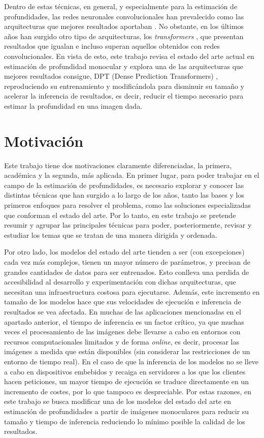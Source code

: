 Dentro de estas técnicas, en general, y especialmente para la estimación de profundidades, las redes neuronales convolucionales han prevalecido como las arquitecturas que mejores resultados aportaban \cite{resnet, efficientnet, gan-depth, Xian_2020_CVPR}. No obstante, en los últimos años han surgido otro tipo de arquitecturas, los \textit{transformers} \cite{NIPS2017_3f5ee243}, que presentan resultados que igualan e incluso superan aquellos obtenidos con redes convolucionales. En vista de esto, este trabajo revisa el estado del arte actual en estimación de profundidad monocular y explora una de las arquitecturas que mejores resultados consigue, DPT (Dense Prediction Transformers) \cite{visiontransformersDPT}, reproduciendo su entrenamiento y modificándola para disminuir su tamaño y acelerar la inferencia de resultados, es decir, reducir el tiempo necesario para estimar la profundidad en una imagen dada. 

\section{Motivación}

Este trabajo tiene dos motivaciones claramente diferenciadas, la primera, académica y la segunda, más aplicada. En primer lugar, para poder trabajar en el campo de la estimación de profundidades, es necesario explorar y conocer las distintas técnicas que han surgido a lo largo de los años, tanto las bases y los primeros enfoques para resolver el problema, como las soluciones especializadas que conforman el estado del arte. Por lo tanto, en este trabajo se pretende resumir y agrupar las principales técnicas para poder, posteriormente, revisar y estudiar los temas que se tratan de una manera dirigida y ordenada.

Por otro lado, los modelos del estado del arte tienden a ser (con excepciones) cada vez más complejos, tienen un mayor número de parámetros, y precisan de grandes cantidades de datos para ser entrenados. Esto conlleva una perdida de accesibilidad al desarrollo y experimentación con dichas arquitecturas, que necesitan una infraestructura costosa para ejecutarse. Además, este incremento en tamaño de los modelos hace que sus velocidades de ejecución e inferencia de resultados se vea afectada. En muchas de las aplicaciones mencionadas en el apartado anterior, el tiempo de inferencia es un factor crítico, ya que muchas veces el procesamiento de las imágenes debe llevarse a cabo en entornos con recursos computacionales limitados y de forma \textit{online}, es decir, procesar las imágenes a medida que están disponibles (sin considerar las restricciones de un entorno de tiempo real). En el caso de que la inferencia de los modelos no se lleve a cabo en dispositivos embebidos y recaiga en servidores a los que los clientes hacen peticiones, un mayor tiempo de ejecución se traduce directamente en un incremento de costes, por lo que tampoco es despreciable. Por estas razones, en este trabajo se busca modificar una de los modelos del estado del arte en estimación de profundidades a partir de imágenes monoculares para reducir su tamaño y tiempo de inferencia reduciendo lo mínimo posible la calidad de los resultados.

